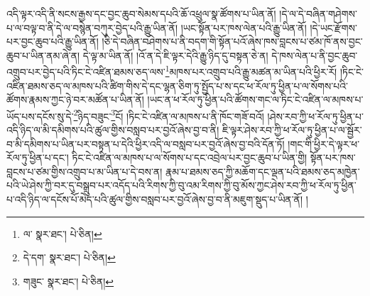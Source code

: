 འདི་ལྟར་འདི་ནི་སངས་རྒྱས་དང་བྱང་ཆུབ་སེམས་དཔའི་ཆོ་འཕྲུལ་སྣ་ཚོགས་པ་ཡིན་ནོ། །དེ་ལ་དེ་བཞིན་གཤེགས་པ་ལ་བལྟ་བ་ནི་དེ་ལ་བསྙེན་བཀུར་བྱེད་པའི་རྒྱུ་ཡིན་ནོ། །ཡང་སྟོན་པར་ཁས་ལེན་པའི་རྒྱུ་ཡིན་ནོ། །དེ་ཡང་རྫོགས་པར་བྱང་ཆུབ་པའི་རྒྱུ་ཡིན་ནོ། །ཅི་དེ་བཞིན་བཤེགས་པ་ནི་བདག་གི་སྟོན་པའོ་ཞེས་ཁས་བླངས་པ་ཙམ་ཁོ་ནས་བྱང་ཆུབ་པ་ཡིན་ནམ་ཞེ་ན། དེ་ལྟ་མ་ཡིན་ནོ། །འོ་ན་དེ་ཇི་ལྟར་དེའི་རྒྱུ་ཉིད་དུ་བསྟན་ཅེ་ན། དེ་ཁས་ལེན་པ་ནི་བྱང་ཆུབ་འགྲུབ་པར་བྱེད་པའི་ཏིང་ངེ་འཛིན་ཐམས་ཅད་ལས་\footnote{ལ་  སྣར་ཐང་།  པེ་ཅིན། }མཁས་པར་འགྲུབ་པའི་རྒྱུ་མཚན་མ་ཡིན་པའི་ཕྱིར་རོ། །ཏིང་ངེ་འཛིན་ཐམས་ཅད་ལ་མཁས་པའི་ཚིག་གིས་དེ་དང་ལྷན་ཅིག་ཏུ་སྤྱོད་པ་ས་དང་ཕ་རོལ་ཏུ་ཕྱིན་པ་ལ་སོགས་པའི་ཚོགས་རྣམས་ཀྱང་ཉེ་བར་མཚོན་པ་ཡིན་ནོ། །ཡང་ན་ཕ་རོལ་ཏུ་ཕྱིན་པའི་ཚོགས་གང་ལ་ཏིང་ངེ་འཛིན་ལ་མཁས་པ་ཡོད་པས་དངོས་སུ་དེ་\footnote{དེ་དག་  སྣར་ཐང་།  པེ་ཅིན། }ཉིད་བཟུང་\footnote{གཟུང་  སྣར་ཐང་།  པེ་ཅིན། }ངོ། །ཏིང་ངེ་འཛིན་ལ་མཁས་པ་ནི་ཁོང་གཟོ་བའོ། །ཤེས་རབ་ཀྱི་ཕ་རོལ་ཏུ་ཕྱིན་པ་འདི་ཉིད་ལ་མི་དམིགས་པའི་ཚུལ་གྱིས་བསླབ་པར་བྱའོ་ཞེས་བྱ་བ་ནི། ཇི་ལྟར་ཤེས་རབ་ཀྱི་ཕ་རོལ་ཏུ་ཕྱིན་པ་ལ་སྦྱོར་བ་མི་དམིགས་པ་ཡིན་པར་བསྟན་པ་དེའི་ཕྱིར་འདི་ལ་བསླབ་པར་བྱའོ་ཞེས་བྱ་བའི་དོན་ཏོ། །གང་གི་ཕྱིར་དེ་ལྟར་ཕ་རོལ་ཏུ་ཕྱིན་པ་དང་། ཏིང་ངེ་འཛིན་ལ་མཁས་པ་ལ་སོགས་པ་དང་འབྲེལ་པར་བྱང་ཆུབ་པ་ཡིན་གྱི། སྟོན་པར་ཁས་བླངས་པ་ཙམ་གྱིས་འགྲུབ་པ་མ་ཡིན་པ་དེ་བས་ན། རྣམ་པ་ཐམས་ཅད་ཀྱི་མཆོག་དང་ལྡན་པའི་ཐམས་ཅད་མཁྱེན་པའི་ཡེ་ཤེས་ཀྱི་བར་དུ་བསྒྲུབ་པར་འདོད་པའི་རིགས་ཀྱི་བུ་འམ་རིགས་ཀྱི་བུ་མོས་ཀྱང་ཤེས་རབ་ཀྱི་ཕ་རོལ་ཏུ་ཕྱིན་པ་འདི་ཉིད་ལ་དངོས་པོ་མེད་པའི་ཚུལ་གྱིས་བསླབ་པར་བྱའོ་ཞེས་བྱ་བ་ནི་མཇུག་སྡུད་པ་ཡིན་ནོ། །
